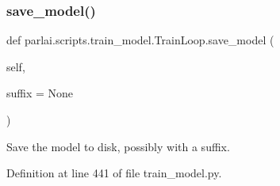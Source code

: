 \mbox{\label{classparlai_1_1scripts_1_1train__model_1_1TrainLoop_a352f759a644e87251c37931bf276309a}} 
\subsubsection{\texorpdfstring{save\+\_\+model()}{save\_model()}}
{\footnotesize\ttfamily def parlai.\+scripts.\+train\+\_\+model.\+Train\+Loop.\+save\+\_\+model (\begin{DoxyParamCaption}\item[{}]{self,  }\item[{}]{suffix = {\ttfamily None} }\end{DoxyParamCaption})}

\begin{DoxyVerb}Save the model to disk, possibly with a suffix.
\end{DoxyVerb}
 

Definition at line 441 of file train\+\_\+model.\+py.


